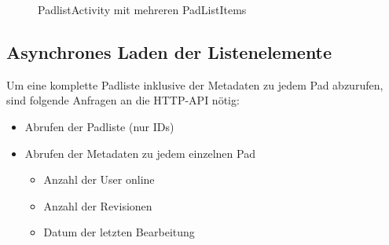 \begin{figure}[h!]
    \centering
    \setlength\fboxsep{0pt}
	  \caption{PadlistActivity mit mehreren PadListItems}
	  \label{fig:Padliste}
\end{figure}


\subsection{Asynchrones Laden der Listenelemente}
Um eine komplette Padliste inklusive der Metadaten zu jedem Pad abzurufen, sind folgende Anfragen an die HTTP-API nötig:
\begin{itemize}
	\item Abrufen der Padliste (nur IDs)
	\item Abrufen der Metadaten zu jedem einzelnen Pad
		\begin{itemize}
			\item Anzahl der User online
			\item Anzahl der Revisionen
			\item Datum der letzten Bearbeitung
		\end{itemize}
\end{itemize}

